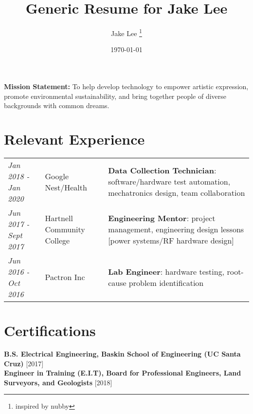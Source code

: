 \documentclass[12pt, letterpaper]{article}
\title{Generic Resume for Jake Lee}
\author{Jake Lee \thanks{inspired by nubby}}
\date{\today}
\begin{document}
	\begin{multicols}{2}
		\begin{center}
			\noindent
			\setlength{\fboxsep}{0.5cm}
		\end{center}
	\columnbreak
		\begin{flushleft}
			\parbox{0.5\textwidth}{
				\textbf{Mission Statement:} To help develop technology to empower artistic expression, promote environmental sustainability, and bring together people of diverse backgrounds with common dreams.
			}
		\end{flushleft}
	\end{multicols}
	\section*{Relevant Experience}
	\begin{center}
		\begin{tabular}{ m{2cm}	 m{6cm} | m{11cm} }
			\textit{Jan 2018 - Jan 2020} & 
			Google Nest/Health \newline [via Artech Information Systems] & 
			\textbf{Data Collection Technician}: software/hardware test automation, mechatronics design, team collaboration\\
			\textit{Jun 2017 - Sept 2017} & 
			Hartnell Community College & 
			\textbf{Engineering Mentor}: project management, engineering design lessons [power systems/RF hardware design]\\
			\textit{Jun 2016 - Oct 2016} & 
			Pactron Inc & 
			\textbf{Lab Engineer}: hardware testing, root-cause problem identification
		\end{tabular}
	\end{center}
	\section*{Certifications}
	\textbf{B.S. Electrical Engineering, Baskin School of Engineering (UC Santa Cruz)} [2017]\\
	\textbf{Engineer in Training (E.I.T), Board for Professional Engineers, Land Surveyors, and Geologists} [2018]
\end{document}
